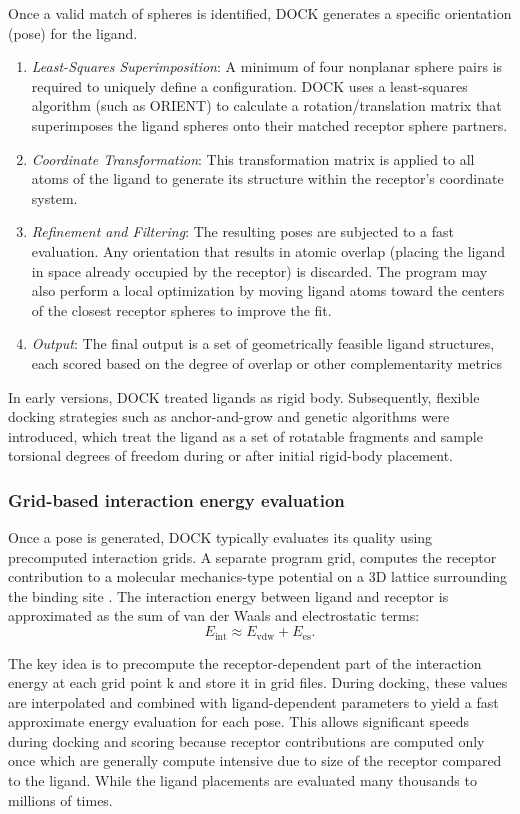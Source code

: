\documentclass[12pt, a4paper]{article}
\begin{document}
Once a valid match of spheres is identified, DOCK generates a specific orientation (pose) for the ligand.
\begin{enumerate}
\item \textit{Least-Squares Superimposition}: A minimum of four nonplanar sphere pairs is required to uniquely define a configuration. DOCK uses a least-squares algorithm (such as ORIENT\cite{CH7_ORIENT}) to calculate a rotation/translation matrix that superimposes the ligand spheres onto their matched receptor sphere partners.
\item \textit{Coordinate Transformation}: This transformation matrix is applied to all atoms of the ligand to generate its  structure within the receptor's coordinate system.
\item \textit{Refinement and Filtering}: The resulting poses are subjected to a fast evaluation. Any orientation that results in atomic overlap (placing the ligand in space already occupied by the receptor) is discarded. The program may also perform a local optimization by moving ligand atoms toward the centers of the closest receptor spheres to improve the fit.
\item \textit{Output}: The final output is a set of geometrically feasible ligand structures, each scored based on the degree of overlap or other complementarity metrics
\end{enumerate}

In early versions, DOCK treated ligands as rigid body. Subsequently, flexible docking strategies such as anchor-and-grow and genetic algorithms were introduced, which treat the ligand as a set of rotatable fragments and sample torsional degrees of freedom during or after initial rigid-body placement\cite{CH7_Oshiro1995,CH7_Meng1993Min}.

\subsubsection{Grid-based interaction energy evaluation}

Once a pose is generated, DOCK typically evaluates its quality using precomputed interaction grids. A separate program grid, computes the receptor contribution to a molecular mechanics-type potential on a 3D lattice surrounding the binding site \cite{CH7_Meng1992Grid}. The interaction energy between ligand and receptor is approximated as the sum of van der Waals and electrostatic terms:
\[
  E_{\text{int}} \approx E_{\text{vdw}} + E_{\text{es}}.
\]

The key idea is to precompute the receptor-dependent part of the interaction energy at each grid point k and store it in grid files. During docking, these values are interpolated and combined with ligand-dependent parameters to yield a fast approximate energy evaluation for each pose. This allows significant speeds during docking and scoring because receptor
contributions are computed only once which are generally compute intensive due to size of the receptor compared to the ligand. While the ligand placements are evaluated many thousands to millions of times.
\end{document}

